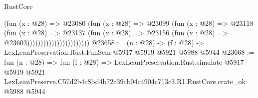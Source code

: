 \begin{lexlean}{RustCore}
\begin{coremodule}
                                      (fun (x : @28) =>
                                      @23080
                                        (fun (x : @28) =>
                                        @23099
                                          (fun (x : @28) =>
                                          @23118
                                            (fun (x : @28) =>
                                            @23137
                                              (fun (x : @28) =>
                                              @23156 (fun (x : @28) => @23603)))))))))))))))))))))))
@23658 := (n : @28) -> (f : @28) -> LexLeanPreservation.Rust.FunSem @5917 @5919 @5921 @5988 @5944
@23668 := fun (n : @28) =>
  fun (f : @28) =>
  LexLeanPreservation.Rust.simulate
    @5917
    @5919
    @5921
    LexLeanPreserve.C57d2b4c8bd4b72c39cb04c4904c713c3.R1.RustCore.crate_ok
    @5988
    @5944
\end{coremodule}
\end{lexlean}
